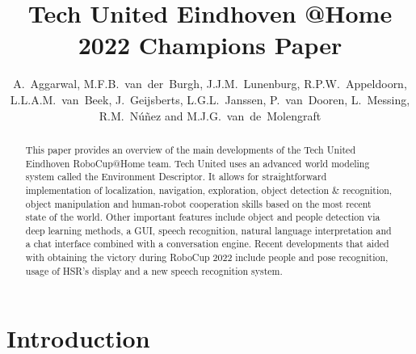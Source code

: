 \documentclass[runningheads,a4paper]{llncs}
\begin{document}

\title{Tech United Eindhoven @Home \\2022 Champions Paper}


\author{A.~Aggarwal, M.F.B.~van~der~Burgh, J.J.M.~Lunenburg, R.P.W.~Appeldoorn, L.L.A.M.~van~Beek, J.~Geijsberts, L.G.L.~Janssen, P.~van~Dooren, L.~Messing, R.M.~Núñez and M.J.G.~van~de~Molengraft}





\maketitle
%
%
%
\begin{abstract}
This paper provides an overview of the main developments of the Tech United Eindhoven RoboCup@Home team. Tech United uses an advanced world modeling system called the Environment Descriptor. It allows for straightforward implementation of localization, navigation, exploration, object detection \& recognition, object manipulation and human-robot cooperation skills based on the most recent state of the world. Other important features include object and people detection via deep learning methods, a GUI, speech recognition, natural language interpretation and a chat interface combined with a conversation engine. Recent developments that aided with obtaining the victory during RoboCup 2022 include people and pose recognition, usage of HSR's display and a new speech recognition system.

\end{abstract}
%
%
%

\section{Introduction}

\end{document}
